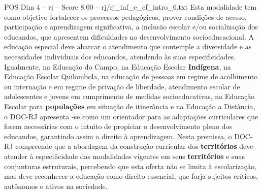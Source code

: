 \begin{textsample}{POS Dim 4 – rj – Score 8.00 – rj/rj\_inf\_e\_ef\_intro\_6.txt}
Esta modalidade tem como objetivo fortalecer os processos pedagógicos, prover condições de acesso, participação e aprendizagem significativa, a inclusão escolar e/ou socialização dos educandos, que apresentem dificuldades no desenvolvimento socioeducacional.
A educação especial deve abarcar o atendimento que contemple a diversidade e as necessidades individuais dos educandos, atendendo às suas especificidades.
Igualmente, na Educação do Campo, na Educação Escolar \textbf{Indígena}, na Educação Escolar Quilombola, na educação de pessoas em regime de acolhimento ou internação e em regime de privação de liberdade, atendimento escolar de adolescentes e jovens em cumprimento de medidas socioeducativas, na Educação Escolar para \textbf{populações} em situação de itinerância e na Educação a Distância, o DOC-RJ apresenta -se como um orientador para as adaptações curriculares que forem necessárias com o intuito de propiciar o desenvolvimento pleno dos educandos, garantindo assim o direito à aprendizagem.
Nesta premissa, o DOC-RJ compreende que a abordagem da construção curricular dos \textbf{territórios} deve atender à especificidade das modalidades vigentes em seus \textbf{territórios} e suas conjunturas estruturais, percebendo que esta oferta não se limita à escolarização, mas deve reconhecer a educação como direito essencial, que forja sujeitos críticos, autônomos e ativos na sociedade.

\end{textsample}
